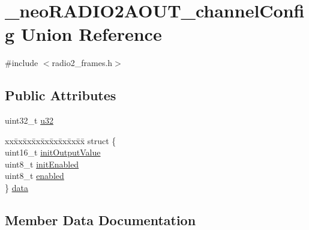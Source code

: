 \hypertarget{union__neo_r_a_d_i_o2_a_o_u_t__channel_config}{}\section{\+\_\+neo\+R\+A\+D\+I\+O2\+A\+O\+U\+T\+\_\+channel\+Config Union Reference}
\label{union__neo_r_a_d_i_o2_a_o_u_t__channel_config}


{\ttfamily \#include $<$radio2\+\_\+frames.\+h$>$}

\subsection*{Public Attributes}
\begin{DoxyCompactItemize}
\item 
uint32\+\_\+t \mbox{\hyperlink{union__neo_r_a_d_i_o2_a_o_u_t__channel_config_ab022e4239a95afb2a99acc67911c4c96}{u32}}
\item 
\begin{tabbing}
xx\=xx\=xx\=xx\=xx\=xx\=xx\=xx\=xx\=\kill
struct \{\\
\>uint16\_t \mbox{\hyperlink{union__neo_r_a_d_i_o2_a_o_u_t__channel_config_ac18d490b73c9bea3924550c513c2c225}{initOutputValue}}\\
\>uint8\_t \mbox{\hyperlink{union__neo_r_a_d_i_o2_a_o_u_t__channel_config_ae53326069fef7984ea68e053d1fadb75}{initEnabled}}\\
\>uint8\_t \mbox{\hyperlink{union__neo_r_a_d_i_o2_a_o_u_t__channel_config_a2270520d41cf3eef2e617f527c2cb47b}{enabled}}\\
\} \mbox{\hyperlink{union__neo_r_a_d_i_o2_a_o_u_t__channel_config_a3f8982b5a6d711da18c1500fa803bef7}{data}}\\

\end{tabbing}\end{DoxyCompactItemize}


\subsection{Member Data Documentation}
\mbox{\label{union__neo_r_a_d_i_o2_a_o_u_t__channel_config_a3f8982b5a6d711da18c1500fa803bef7}} 
